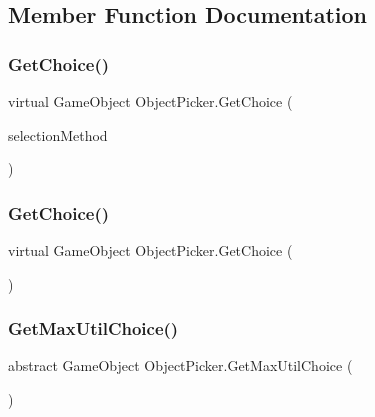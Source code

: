 \subsection{Member Function Documentation}
\mbox{\label{class_object_picker_af46555e63096c06e8148294c71d29ae0}} 
\subsubsection{\texorpdfstring{Get\+Choice()}{GetChoice()}\hspace{0.1cm}{\footnotesize\ttfamily [1/2]}}
{\footnotesize\ttfamily virtual Game\+Object Object\+Picker.\+Get\+Choice (\begin{DoxyParamCaption}\item[{\mbox{\hyperlink{_object_picker_8cs_a2dcef18caa6de91171bf235b9189206d}{Selection\+Method}}}]{selection\+Method }\end{DoxyParamCaption})\hspace{0.3cm}{\ttfamily [virtual]}}

\mbox{\label{class_object_picker_ae93cde0e42852dcbe39015206c70cfd5}} 
\subsubsection{\texorpdfstring{Get\+Choice()}{GetChoice()}\hspace{0.1cm}{\footnotesize\ttfamily [2/2]}}
{\footnotesize\ttfamily virtual Game\+Object Object\+Picker.\+Get\+Choice (\begin{DoxyParamCaption}{ }\end{DoxyParamCaption})\hspace{0.3cm}{\ttfamily [virtual]}}

\mbox{\label{class_object_picker_a22f1eaaa6cc1c7b545f0fb5c369fc445}} 
\subsubsection{\texorpdfstring{Get\+Max\+Util\+Choice()}{GetMaxUtilChoice()}}
{\footnotesize\ttfamily abstract Game\+Object Object\+Picker.\+Get\+Max\+Util\+Choice (\begin{DoxyParamCaption}{ }\end{DoxyParamCaption})\hspace{0.3cm}{\ttfamily [pure virtual]}}

